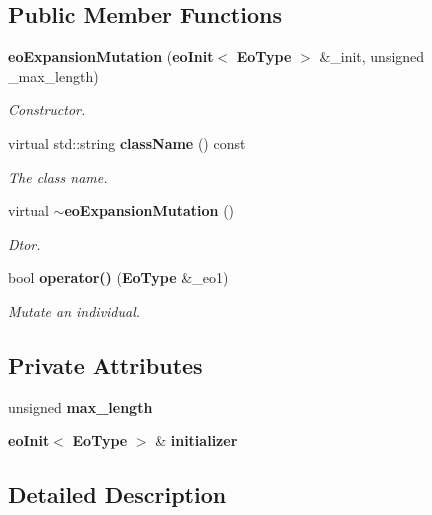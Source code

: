 \subsection*{Public Member Functions}
\begin{CompactItemize}
\item 
{\bf eo\-Expansion\-Mutation} ({\bf eo\-Init}$<$ {\bf Eo\-Type} $>$ \&\_\-init, unsigned \_\-max\_\-length)
\begin{CompactList}\small\item\em Constructor. \item\end{CompactList}\item 
virtual std::string {\bf class\-Name} () const \label{classeo_expansion_mutation_a1}

\begin{CompactList}\small\item\em The class name. \item\end{CompactList}\item 
virtual {\bf $\sim$eo\-Expansion\-Mutation} ()\label{classeo_expansion_mutation_a2}

\begin{CompactList}\small\item\em Dtor. \item\end{CompactList}\item 
bool {\bf operator()} ({\bf Eo\-Type} \&\_\-eo1)
\begin{CompactList}\small\item\em Mutate an individual. \item\end{CompactList}\end{CompactItemize}
\subsection*{Private Attributes}
\begin{CompactItemize}
\item 
unsigned {\bf max\_\-length}\label{classeo_expansion_mutation_r0}

\item 
{\bf eo\-Init}$<$ {\bf Eo\-Type} $>$ \& {\bf initializer}\label{classeo_expansion_mutation_r1}

\end{CompactItemize}


\subsection{Detailed Description}
